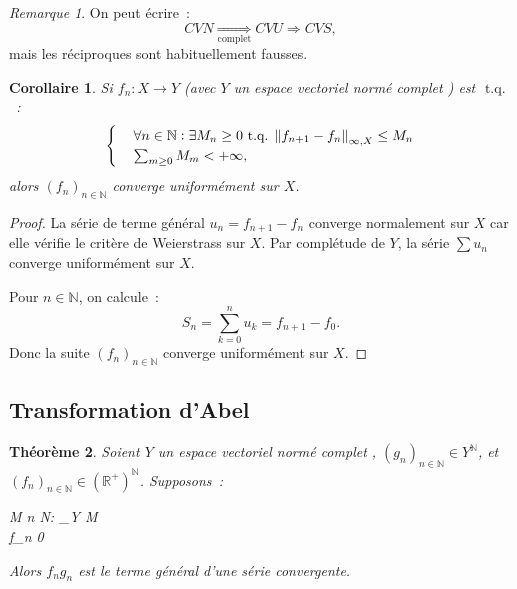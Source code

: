 \documentclass{report}
\newtheorem{thm}{Théorème}[chapter]
\newtheorem{cor}[thm]{Corollaire}
\theoremstyle{definition}
\theoremstyle{remark}
\newtheorem*{rmq}{Remarque}
\numberwithin{equation}{section}
\newcommand{\R}{\mathbb R}
\newcommand{\Rp}{\R^{+}}
\newcommand{\N}{\mathbb N}
\newcommand{\tq}{\text{ t.q. }}
\newcommand{\seq}[3]{\left(#1_{#2}\right)_{#2 \in #3}}
\newcommand{\mconv}[3]{\xrightarrow[#1 \to #2]{#3}}
\newcommand{\pinfty}{{+\infty}}
\newcommand{\evn}{espace vectoriel normé }
\newcommand{\evnc}{{\evn} complet }
\begin{document}
			\begin{rmq} On peut écrire~:
			\begin{equation}
				CVN \underset {\text{complet}}\Rightarrow CVU \Rightarrow CVS,
			\end{equation}
			mais les réciproques sont habituellement fausses.
			\end{rmq}
			\begin{cor} Si $f_n : X \to Y$ (avec $Y$ un \evnc) est $\tq$~:
			\begin{align}
				\begin{cases}
					&\forall n \in \N : \exists M_n \geq 0 \tq \norm {f_{n+1} - f_n}_{\infty, X} \leq M_n \\
					&\sum_{m \geq 0}M_m < \pinfty,
				\end{cases}
			\end{align}
			alors $\seq fn\N$ converge uniformément sur $X$.
			\end{cor}

			\begin{proof} La série de terme général $u_n = f_{n+1}-f_n$ converge normalement sur $X$ car elle vérifie le critère de Weierstrass sur $X$. Par
			complétude de $Y$, la série $\sum u_n$ converge uniformément sur $X$.

			Pour $n \in \N$, on calcule~:
			\begin{equation}
				S_n = \sum_{k=0}^nu_k = f_{n+1}-f_0.
			\end{equation}
			Donc la suite $\seq fn\N$ converge uniformément sur $X$.
			\end{proof}

		\subsection{Transformation d'Abel}
			\begin{thm} Soient $Y$ un \evnc, $\seq gn\N \in Y^{\N}$, et $\seq fn\N \in (\Rp)^{\N}$. Supposons~:
			\begin{numcases}
				\exists M  \tq \forall n \in \N : _Y \leq M \\
				f_n  \mconv n\pinfty{} 0
			\end{numcases}
			Alors $f_ng_n$ est le terme général d'une série convergente.
			\end{thm}
\end{document}
